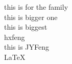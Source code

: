 \documentclass[a4paper]{mytest}
\begin{document}
\begin{CJK}{UTF8}{gbsn}
\begin{center}
\bigsize this is for the family\\
\bigersize this is bigger one\\
\bigest this is biggest\\
\mybig hxfeng\\

\huge   this is JYFeng\\
\mybig \LaTeX
\end{center}
\end{CJK}
\end{document}
